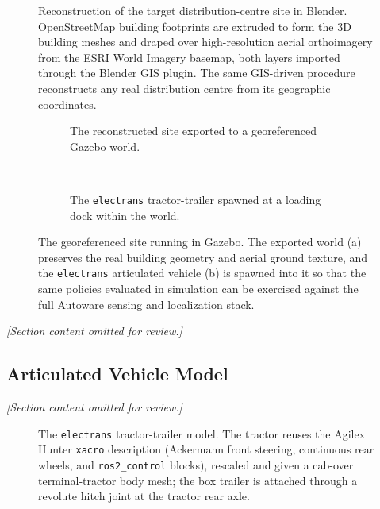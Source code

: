 \begin{figure}[H]
    \centering
    \caption{Reconstruction of the target distribution-centre site in Blender. OpenStreetMap building footprints are extruded to form the 3D building meshes and draped over high-resolution aerial orthoimagery from the ESRI World Imagery basemap, both layers imported through the Blender GIS plugin. The same GIS-driven procedure reconstructs any real distribution centre from its geographic coordinates.}
    \label{fig:geo_sim_blender}
\end{figure}

\begin{figure}[H]
    \centering
    \begin{subfigure}[b]{0.9\textwidth}
        \centering
        \caption{The reconstructed site exported to a georeferenced Gazebo world.}
        \label{fig:geo_sim_gazebo_world}
    \end{subfigure}
    \\[0.75em]
    \begin{subfigure}[b]{0.9\textwidth}
        \centering
        \caption{The \texttt{electrans} tractor-trailer spawned at a loading dock within the world.}
        \label{fig:geo_sim_gazebo_vehicle}
    \end{subfigure}
    \caption{The georeferenced site running in Gazebo. The exported world (a) preserves the real building geometry and aerial ground texture, and the \texttt{electrans} articulated vehicle (b) is spawned into it so that the same policies evaluated in simulation can be exercised against the full Autoware sensing and localization stack.}
    \label{fig:geo_sim_gazebo}
\end{figure}

\textit{[Section content omitted for review.]}

\subsection{Articulated Vehicle Model}
\label{sec:electrans_model}
\textit{[Section content omitted for review.]}

\begin{figure}[H]
    \centering
    \caption{The \texttt{electrans} tractor-trailer model. The tractor reuses the Agilex Hunter \texttt{xacro} description (Ackermann front steering, continuous rear wheels, and \texttt{ros2\_control} blocks), rescaled and given a cab-over terminal-tractor body mesh; the box trailer is attached through a revolute hitch joint at the tractor rear axle.}
    \label{fig:electrans_model}
\end{figure}


